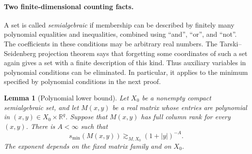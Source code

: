 \documentclass[11pt]{amsart}
\newtheorem{lemma}[theorem]{Lemma}
\theoremstyle{definition}
\theoremstyle{remark}
\newcommand{\R}{\mathbb R}
\numberwithin{equation}{section}
\begin{document}
\paragraph{Two finite-dimensional counting facts.}

A set is called \emph{semialgebraic} if membership can be described by finitely many polynomial equalities and inequalities, combined using ``and'', ``or'', and ``not''. The coefficients in these conditions may be arbitrary real numbers. The Tarski--Seidenberg projection theorem says that forgetting some coordinates of such a set again gives a set with a finite description of this kind. Thus auxiliary variables in polynomial conditions can be eliminated. In particular, it applies to the minimum specified by polynomial conditions in the next proof.

\begin{lemma}[Polynomial lower bound]\label{pl:semialgebraic-coercivity}
Let $X_0$ be a nonempty compact semialgebraic set, and let $M(x,y)$ be a real matrix whose entries are polynomial in $(x,y)\in X_0\times\R^q$. Suppose that $M(x,y)$ has full column rank for every $(x,y)$. There is $A<\infty$ such that
\begin{equation}\label{pl:coercivity}
s_{\min}(M(x,y))\gtrsim_{M,X_0}(1+|y|)^{-A}.
\end{equation}
The exponent depends on the fixed matrix family and on $X_0$.
\end{lemma}
\end{document}
